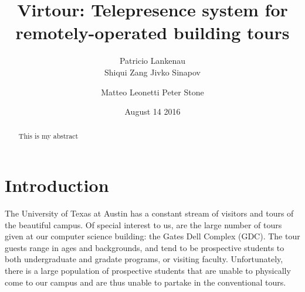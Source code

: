 \documentclass{sig-alternate-05-2015}
\begin{document}
\doi{}

\isbn{}



%

\title{Virtour: Telepresence system for remotely-operated building tours}

\author{
\alignauthor
Patricio Lankenau\\
\alignauthor
Shiqui Zang
\alignauthor
Jivko Sinapov
\and 
\alignauthor
Matteo Leonetti
\alignauthor
Peter Stone
}
\date{August 14 2016}

\maketitle
\begin{abstract}
  This is my abstract
\end{abstract}


\section{Introduction}

The University of Texas at Austin has a constant stream of visitors and tours
of the beautiful campus. Of special interest to us, are the large number of
tours given at our computer science building: the Gates Dell Complex (GDC). The
tour guests range in ages and backgrounds, and tend to be prospective students
to both undergraduate and gradate programs, or visiting faculty. Unfortunately,
there is a large population of prospective students that are unable to
physically come to our campus and are thus unable to partake in the
conventional tours.
\end{document}
